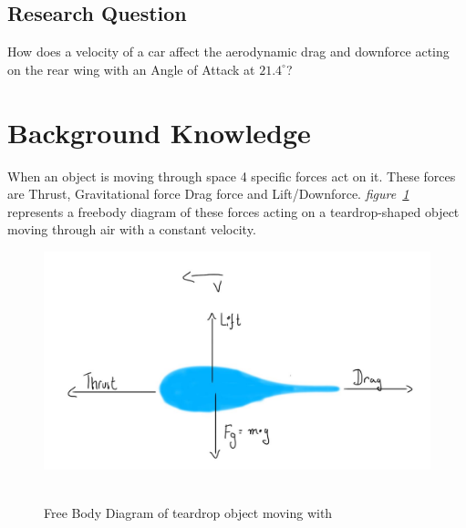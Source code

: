 \documentclass[11pt, a4paper]{article}
\begin{document}
\subsection{Research Question}
How does a velocity of a car affect the aerodynamic drag and downforce acting on the rear wing with an Angle of Attack at $21.4^{\circ}$? 

\section{Background Knowledge}
When an object is moving through space 4 specific forces act on it. These forces are Thrust, Gravitational force
Drag force and Lift/Downforce. \textit{figure~\ref{fig:freeBodyDiagram}} represents a freebody diagram of these forces acting on a teardrop-shaped object moving through air with a constant velocity.
\begin{figure}[H]
    \caption{Free Body Diagram of teardrop object moving with }
    \centering 
    \includegraphics[width=\textwidth]{images/Free_body_teardrop.jpg}
~\label{fig:freeBodyDiagram}
\end{figure}
\end{document}
